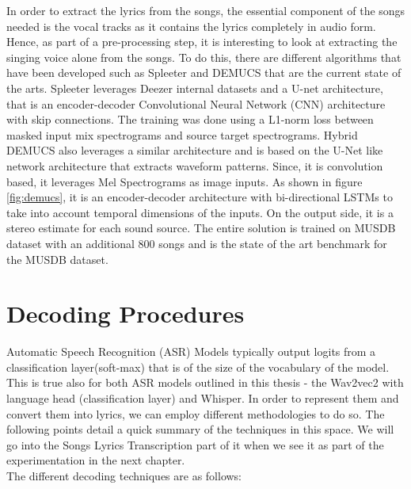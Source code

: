 In order to extract the lyrics from the songs, the essential component of the songs needed is the vocal tracks as it contains the lyrics completely in audio form. Hence, as part of a pre-processing step, it is interesting to look at extracting the singing voice alone from the songs. To do this, there are different algorithms that have been developed such as Spleeter \cite{spleeter2020} and DEMUCS \cite{rouard2022hybrid} that are the current state of the arts. Spleeter leverages Deezer internal datasets and a U-net architecture, that is an encoder-decoder Convolutional Neural Network (CNN) architecture with skip connections. The training was done using a L1-norm loss between masked input mix spectrograms and source target spectrograms. Hybrid DEMUCS also leverages a similar architecture and is based on the U-Net like network architecture that extracts waveform patterns. Since, it is convolution based, it leverages Mel Spectrograms as image inputs. As shown in figure \ref{fig:demucs}, it is an encoder-decoder architecture with bi-directional LSTMs to take into account temporal dimensions of the inputs. On the output side, it is a stereo estimate for each sound source. The entire solution is trained on MUSDB dataset with an additional 800 songs and is the state of the art benchmark for the MUSDB dataset.



\section{Decoding Procedures}%
\label{sec:decoders}

Automatic Speech Recognition (ASR) Models typically output logits from a classification layer(soft-max) that is of the size of the vocabulary of the model. This is true also for both ASR models outlined in this thesis - the Wav2vec2 with language head (classification layer) and Whisper. In order to represent them and convert them into lyrics, we can employ different methodologies to do so. The following points detail a quick summary of the techniques in this space. We will go into the Songs Lyrics Transcription part of it when we see it as part of the experimentation in the next chapter. \\

The different decoding techniques are as follows: 

